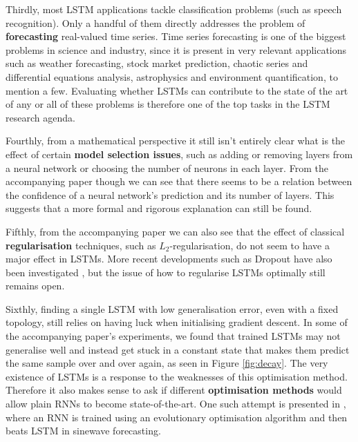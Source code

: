 \documentclass[pdftex,12pt,a4paper]{article}
\theoremstyle{definition}
\theoremstyle{remark}
\begin{document}
\par Thirdly, most LSTM applications tackle classification problems (such as speech recognition). Only a handful of them directly addresses the problem of \textbf{forecasting} real-valued time series. Time series forecasting is one of the biggest problems in science and industry, since it is present in very relevant applications such as weather forecasting, stock market prediction, chaotic series and differential equations analysis, astrophysics and environment quantification, to mention a few. Evaluating whether LSTMs can contribute to the state of the art of any or all of these problems is therefore one of the top tasks in the LSTM research agenda.

\par Fourthly, from a mathematical perspective it still isn't entirely clear what is the effect of certain \textbf{model selection issues}, such as adding or removing layers from a neural network or choosing the number of neurons in each layer. From the accompanying paper though we can see that there seems to be a relation between the confidence of a neural network's prediction and its number of layers. This suggests that a more formal and rigorous explanation can still be found.

\par Fifthly, from the accompanying paper we can also see that the effect of classical \textbf{regularisation} techniques, such as $L_2$-regularisation, do not seem to have a major effect in LSTMs. More recent developments such as Dropout have also been investigated \cite{Srivastava2014}, but the issue of how to regularise LSTMs optimally still remains open.

\par Sixthly, finding a single LSTM with low generalisation error, even with a fixed topology, still relies on having luck when initialising gradient descent. In some of the accompanying paper's experiments, we found that trained LSTMs may not generalise well and instead get stuck in a constant state that makes them predict the same sample over and over again, as seen in Figure \ref{fig:decay}. The very existence of LSTMs is a response to the weaknesses of this optimisation method. Therefore it also makes sense to ask if different \textbf{optimisation methods} would allow plain RNNs to become state-of-the-art. One such attempt is presented in \cite{Schmidhuber2007}, where an RNN is trained using an evolutionary optimisation algorithm and then beats LSTM in sinewave forecasting.
\end{document}
